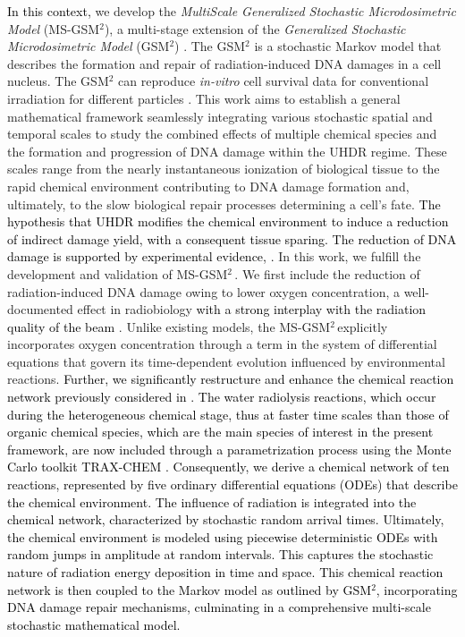 \documentclass[10pt]{iopart}
\newcommand{\gsm}{MS-GSM$^2\,$}
\newcommand{\marco}[1]{\textcolor{black}{#1}}
\newcommand{\fra}[1]{\textcolor{black}{#1}}
\newcommand{\ema}[1]{\textcolor{black}{#1}}
\numberwithin{table}{section}
\begin{document}
\marco{In this context,} we develop the \textit{MultiScale Generalized Stochastic Microdosimetric Model} (MS-GSM$^2$), a multi-stage extension of the \textit{Generalized Stochastic Microdosimetric Model} (GSM$^2$) \cite{cordoni2021generalized, cordoni2022cell, cordoni2022multiple, cordoni2023spatial, missiaggia2022cell, Battestini2023}. The GSM$^2$ is a stochastic Markov model that describes the formation and repair of radiation-induced DNA damages in a cell nucleus. The GSM$^2$ can reproduce \textit{in-vitro} cell survival data for conventional irradiation for different particles \cite{missiaggia2022cell, cartechini2024integrating}. This work aims to establish a general mathematical framework seamlessly integrating various stochastic spatial and temporal scales to study the combined effects of multiple chemical species and the formation and progression of DNA damage within the UHDR regime. These scales range from the nearly instantaneous ionization of biological tissue to the rapid chemical environment contributing to DNA damage formation and, ultimately, to the slow biological repair processes determining a cell's fate. \fra{The hypothesis that UHDR modifies the chemical environment to induce a reduction of indirect damage yield, with a consequent tissue sparing. The reduction of DNA damage is supported by experimental evidence, \cite{Tessonnier2021, Cooper2022, Wanstall2024}.} In this work, we fulfill the development and validation of \gsm \cite{Battestini2023}. We first include the reduction of radiation-induced DNA damage owing to lower oxygen concentration, a well-documented effect in radiobiology\ema{ with a strong interplay with the radiation quality of the beam} \cite{Scifoni2013}. Unlike existing models, the \gsm explicitly incorporates oxygen concentration through a term in the system of differential equations that govern its time-dependent evolution influenced by environmental reactions. \fra{Further, we significantly restructure and enhance the chemical reaction network previously considered in \cite{Labarbe2020}. The water radiolysis reactions, which occur \ema{during the heterogeneous chemical stage, thus} at faster time scales than those of organic chemical species, which are the main species of interest in the present framework, are now included through a parametrization process using the Monte Carlo toolkit TRAX-CHEM \cite{Boscolo2018}.
Consequently, we derive a chemical network of ten reactions, represented by five ordinary differential equations (ODEs) that describe the chemical environment. The influence of radiation is integrated into the chemical network, characterized by stochastic random arrival times. Ultimately, the chemical environment is modeled using piecewise deterministic ODEs with random jumps in amplitude at random intervals. This captures the stochastic nature of radiation energy deposition in time and space. This chemical reaction network is then coupled to the Markov model as outlined by GSM$^2$, incorporating DNA damage repair mechanisms, culminating in a comprehensive multi-scale stochastic mathematical model.}
\end{document}
